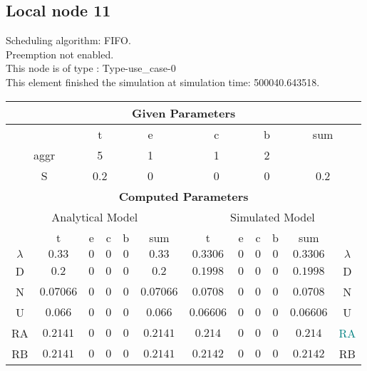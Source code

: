 \documentclass{article}
\begin{document}
\subsection{Local node 11}
Scheduling algorithm: FIFO.\\Preemption not enabled. \\This node is of type : Type-use\_case-0\\
This element finished the simulation at simulation time: 500040.643518.\\
\begin{table}[H]\centering\begin{tabular}{@{}c|cccc|c||cccc|c|c@{}}\toprule\multicolumn{12}{c}{\textbf{Given Parameters}}\\\midrule\multicolumn{2}{c|}{ } & \multicolumn{2}{c}{t} & \multicolumn{2}{c}{e} & \multicolumn{2}{c}{c} & \multicolumn{2}{c}{b} & \multicolumn{2}{|c}{sum} \\\midrule\multicolumn{2}{c|}{aggr} & \multicolumn{2}{c}{5} & \multicolumn{2}{c}{1} & \multicolumn{2}{c}{1} & \multicolumn{2}{c}{2} & \multicolumn{2}{|c}{ } \\ \midrule\multicolumn{2}{c|}{S} & \multicolumn{2}{c}{0.2} & \multicolumn{2}{c}{0} & \multicolumn{2}{c}{0} & \multicolumn{2}{c}{0} & \multicolumn{2}{|c}{0.2}\\ \midrule\midrule\multicolumn{12}{c}{\textbf{Computed Parameters}}\\ \midrule\multicolumn{6}{c||}{Analytical Model} & \multicolumn{6}{c}{Simulated Model}\\ 
 \midrule & t & e & c & b & sum & t & e & c & b & sum &  \\ \midrule$\lambda$ &$0.33$ & $0$ & $0$ & $0$ & $0.33$ & $0.3306$ & $0$ & $0$ & $0$ & $0.3306$& $\lambda$ \\D & $0.2$ & $0$ & $0$ & $0$ & $0.2$ & $0.1998$ & $0$ & $0$ & $0$ & $0.1998$& D\\N & $0.07066$ & $0$ & $0$ & $0$ & $0.07066$ & $0.0708$ & $0$ & $0$ & $0$ & $0.0708$& N\\U & $0.066$ & $0$ & $0$ & $0$ & $0.066$ & $0.06606$ & $0$ & $0$ & $0$ & $0.06606$& U\\RA & $0.2141$ & $0$ & $0$ & $0$ & $0.2141$ & $0.214$ & $0$ & $0$ & $0$ & $0.214$& \textcolor{teal}{RA}\\RB & $0.2141$ & $0$ & $0$ & $0$ & $0.2141$ & $0.2142$ & $0$ & $0$ & $0$ & $0.2142$& RB\\
\bottomrule
\end{tabular}
\end{table}
\filbreak
\end{document}
